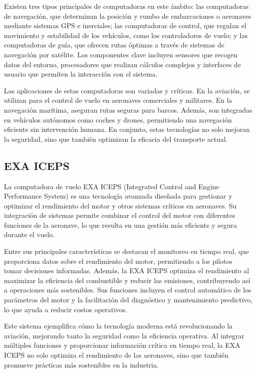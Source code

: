 Existen tres tipos principales de computadoras en este ámbito: las computadoras de navegación, que determinan la posición y rumbo de embarcaciones o aeronaves mediante sistemas GPS e inerciales; las computadoras de control, que regulan el movimiento y estabilidad de los vehículos, como los controladores de vuelo; y las computadoras de guía, que ofrecen rutas óptimas a través de sistemas de navegación por satélite. Los componentes clave incluyen sensores que recogen datos del entorno, procesadores que realizan cálculos complejos y interfaces de usuario que permiten la interacción con el sistema.

Las aplicaciones de estas computadoras son variadas y críticas. En la aviación, se utilizan para el control de vuelo en aeronaves comerciales y militares. En la navegación marítima, aseguran rutas seguras para barcos. Además, son integradas en vehículos autónomos como coches y drones, permitiendo una navegación eficiente sin intervención humana. En conjunto, estas tecnologías no solo mejoran la seguridad, sino que también optimizan la eficacia del transporte actual.

\subsection{EXA ICEPS}\label{sec:exaiceps}
La computadora de vuelo EXA ICEPS (Integrated Control and Engine Performance System) es una tecnología avanzada diseñada para gestionar y optimizar el rendimiento del motor y otros sistemas críticos en aeronaves. Su integración de sistemas permite combinar el control del motor con diferentes funciones de la aeronave, lo que resulta en una gestión más eficiente y segura durante el vuelo.

Entre sus principales características se destacan el monitoreo en tiempo real, que proporciona datos sobre el rendimiento del motor, permitiendo a los pilotos tomar decisiones informadas. Además, la EXA ICEPS optimiza el rendimiento al maximizar la eficiencia del combustible y reducir las emisiones, contribuyendo así a operaciones más sostenibles. Sus funciones incluyen el control automático de los parámetros del motor y la facilitación del diagnóstico y mantenimiento predictivo, lo que ayuda a reducir costos operativos.

Este sistema ejemplifica cómo la tecnología moderna está revolucionando la aviación, mejorando tanto la seguridad como la eficiencia operativa. Al integrar múltiples funciones y proporcionar información crítica en tiempo real, la EXA ICEPS no solo optimiza el rendimiento de las aeronaves, sino que también promueve prácticas más sostenibles en la industria.
